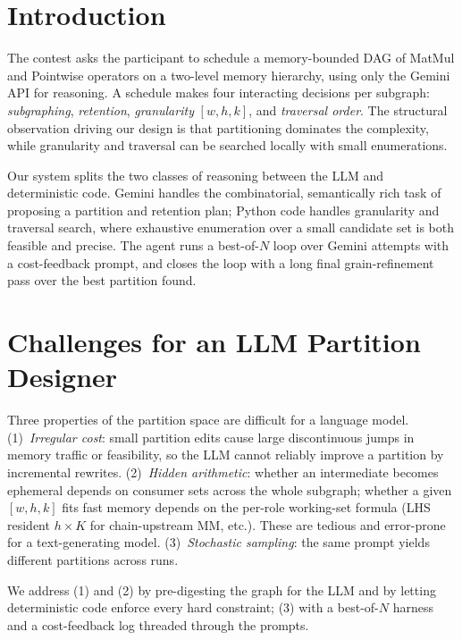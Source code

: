 \section{Introduction}

The contest asks the participant to schedule a memory-bounded DAG of
MatMul and Pointwise operators on a two-level memory hierarchy, using
only the Gemini API for reasoning. A schedule makes four interacting
decisions per subgraph: \emph{subgraphing}, \emph{retention},
\emph{granularity} $[w,h,k]$, and \emph{traversal order}. The
structural observation driving our design is that partitioning
dominates the complexity, while granularity and traversal can be
searched locally with small enumerations.

Our system splits the two classes of reasoning between the LLM and
deterministic code. Gemini handles the combinatorial, semantically
rich task of proposing a partition and retention plan; Python code
handles granularity and traversal search, where exhaustive
enumeration over a small candidate set is both feasible and precise.
The agent runs a best-of-$N$ loop over Gemini attempts with a
cost-feedback prompt, and closes the loop with a long final
grain-refinement pass over the best partition found.


\section{Challenges for an LLM Partition Designer}

Three properties of the partition space are difficult for a language model.
(1)~\emph{Irregular cost}: small partition edits cause large discontinuous
jumps in memory traffic or feasibility, so the LLM cannot reliably improve
a partition by incremental rewrites. (2)~\emph{Hidden arithmetic}: whether
an intermediate becomes ephemeral depends on consumer sets across the
whole subgraph; whether a given $[w,h,k]$ fits fast memory depends on the
per-role working-set formula (LHS resident $h\times K$ for chain-upstream
MM, etc.). These are tedious and error-prone for a text-generating model.
(3)~\emph{Stochastic sampling}: the same prompt yields different partitions
across runs.

We address (1) and (2) by pre-digesting the graph for the LLM and by
letting deterministic code enforce every hard constraint; (3) with a
best-of-$N$ harness and a cost-feedback log threaded through the
prompts.


